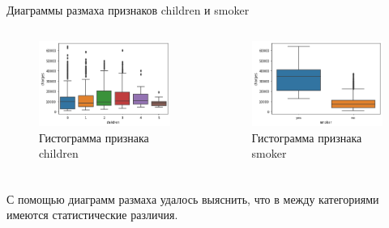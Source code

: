 \documentclass[c]{beamer}  %
\begin{document}
	\begin{frame}
		\frametitle{\insertsection}

		\begin{block}{Диаграммы размаха признаков children и smoker}
			\begin{columns}[onlytextwidth,T]
				\begin{figure}[H]
					\centering
					\includegraphics[scale=0.35]{children_boxplot.png}
					\caption{Гистограмма признака children}
					\label{img:children_boxplot}
				\end{figure}
				\begin{figure}[H]
					\centering
					\includegraphics[scale=0.35]{smoker_boxplot.png}
					\caption{Гистограмма признака smoker}
					\label{img:smoker_boxplot}
				\end{figure}
			\end{columns}
		\end{block}
	\end{frame}

	\begin{frame}
		\frametitle{\insertsection}
		\justifying
		С помощью диаграмм размаха удалось выяснить, что в между категориями имеются статистические различия.
	\end{frame}
\end{document}
